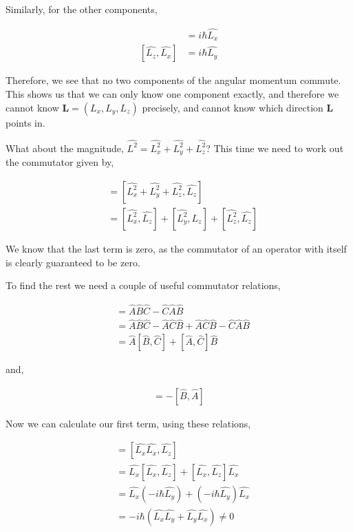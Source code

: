 \documentclass[11pt]{amsart}
\begin{document}
Similarly, for the other components,

\begin{align*}
  [\hat{L_y}, \hat{L_z}] &= i\hbar\hat{L_x} \\
  [\hat{L_z}, \hat{L_x}] &= i\hbar\hat{L_y}
\end{align*}

Therefore, we see that no two components of the angular momentum commute. This shows us that we can only know one component exactly, and therefore we cannot know $\mathbf{L} = (L_x, L_y, L_z)$ precisely, and cannot know which direction $\mathbf{L}$ points in.

What about the magnitude, $\hat{L^2} = \hat{L_x^2} + \hat{L_y^2} + \hat{L_z^2}$? This time we need to work out the commutator given by,

\begin{align*}
  [\hat{L^2}, \hat{L_z}] &= [\hat{L_x^2} + \hat{L_y^2} + \hat{L_z^2}, \hat{L_z}] \\
                         &= [\hat{L_x^2}, \hat{L_z}] + [\hat{L_y^2}, \hat{L_z}] + [\hat{L_z^2}, \hat{L_z}]
\end{align*}

We know that the last term is zero, as the commutator of an operator with itself is clearly guaranteed to be zero.

To find the rest we need a couple of useful commutator relations,

\begin{align*}
  [\hat{A}\hat{B}, \hat{C}] &= \hat{A}\hat{B}\hat{C}-\hat{C}\hat{A}\hat{B} \\
                            &= \hat{A}\hat{B}\hat{C}-\hat{A}\hat{C}\hat{B}+\hat{A}\hat{C}\hat{B}-\hat{C}\hat{A}\hat{B} \\
                            &= \hat{A}[\hat{B},\hat{C}]+[\hat{A},\hat{C}]\hat{B}
\end{align*}

and,

\begin{align*}
  [\hat{A},\hat{B}]=-[\hat{B},\hat{A}]
\end{align*}

Now we can calculate our first term, using these relations,

\begin{align*}
  [\hat{L_x^2}, \hat{L_z}] &= [\hat{L_x}\hat{L_x}, \hat{L_z}] \\
                           &= \hat{L_x}[\hat{L_x}, \hat{L_z}] + [\hat{L_x}, \hat{L_z}]\hat{L_x} \\
                           &= \hat{L_x}(-i\hbar\hat{L_y}) + (-i\hbar\hat{L_y})\hat{L_x} \\
                           &= -i\hbar(\hat{L_x}\hat{L_y} + \hat{L_y}\hat{L_x}) \neq 0
\end{align*}
\end{document}
